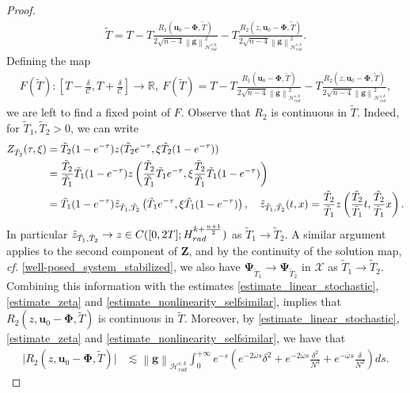 \documentclass[12pt,reqno]{amsart}
\theoremstyle{plain}
\theoremstyle{remark}
\theoremstyle{plain}
\theoremstyle{definition}
\numberwithin{equation}{section}
\numberwithin{equation}{section}
\def\R{{\mathbb R}}
\newcommand{\norm}[1]{\left\|#1\right\|}
\newcommand{\HH}{\mathcal{H}}
\begin{document}
\begin{proof}
\begin{align*}
			\tilde{T} =T-T\frac{R_{1}(\mathbf{u}_0-\mathbf{\Phi},\tilde{T})}{2\sqrt{n-4}\norm{\mathbf{g}}_{\HH_{rad}^{s,k}}^2}-T\frac{R_2(z,\mathbf{u}_0-\mathbf{\Phi},\tilde{T})}{2\sqrt{n-4}\norm{\mathbf{g}}_{\HH_{rad}^{s,k}}^2}.
		\end{align*}
		Defining the map
		\begin{align*}
			F(\tilde{T}):\left[T-\frac{\delta}{\mathcal{C}},T+\frac{\delta}{\mathcal{C}}\right]\rightarrow \R,\ F(\tilde{T})=T-T\frac{R_{1}(\mathbf{u}_0-\mathbf{\Phi},\tilde{T})}{2\sqrt{n-4}\norm{\mathbf{g}}_{\HH_{rad}^{s,k}}^2}-T\frac{R_2(z,\mathbf{u}_0-\mathbf{\Phi},\tilde{T})}{2\sqrt{n-4}\norm{\mathbf{g}}_{\HH_{rad}^{s,k}}^2},
		\end{align*}
		we are left to find a fixed point of $F.$
		Observe that $R_2$ is continuous in $\tilde{T}$. Indeed, for $\tilde{T}_1,\tilde{T}_2>0$, we can write \begin{align*}
			Z_{\tilde{T}_2}(\tau,\xi)&=\tilde{T}_2(1-e^{-\tau})z(\tilde{T}_2 e^{-\tau},\xi \tilde{T}_2(1-e^{-\tau}))\\ & =\frac{\tilde{T}_2}{\tilde{T}_1}\tilde{T}_1 (1-e^{-\tau}) z\left(\frac{\tilde{T}_2}{\tilde{T}_1}\tilde{T}_1 e^{-\tau},\xi \frac{\tilde{T}_2}{\tilde{T}_1}\tilde{T}_1 (1-e^{-\tau})\right)\\ & = \tilde{T}_1(1-e^{-\tau})\Tilde{z}_{\tilde{T}_1,\tilde{T}_2}\left(\tilde{T}_1 e^{-\tau},\xi \tilde{T}_1(1-e^{-\tau})\right),\quad \Tilde{z}_{\tilde{T}_1,\tilde{T}_2}(t,x)=\frac{\tilde{T}_2}{\tilde{T}_1} z\left(\frac{\tilde{T}_2}{\tilde{T}_1}t,\frac{\tilde{T}_2}{\tilde{T}_1}x\right).
		\end{align*}
		In particular $\Tilde{z}_{\tilde{T}_1,\tilde{T}_2}\rightarrow z \in C([0,2T];H^{k+\frac{n+1}{2}}_{rad})$ as $\tilde{T}_1\rightarrow \tilde{T}_2.$ A similar argument applies to the second component of $\mathbf{Z}$, and by the continuity of the solution map, \emph{cf.} \autoref{well-posed_system_stabilized}, we also have $\mathbf{\Psi}_{\tilde{T}_1}\rightarrow \mathbf{\Psi}_{\tilde{T}_2}$ in $\mathcal{X}$ as $\tilde{T}_1\rightarrow \tilde{T}_2.$ Combining this information with the estimates \eqref{estimate_linear_stochastic}, \eqref{estimate_zeta} and \eqref{estimate_nonlinearity_selfsimilar}, implies that $R_2(z,\mathbf{u}_0-\mathbf{\Phi},\tilde{T})$ is continuous in $\tilde{T}$. Moreover, by \eqref{estimate_linear_stochastic}, \eqref{estimate_zeta} and \eqref{estimate_nonlinearity_selfsimilar}, we have that
		\begin{align*}
			\lvert R_2(z,\mathbf{u}_0-\mathbf{\Phi},\tilde{T})\rvert & \lesssim \norm{\mathbf{g}}_{\HH_{rad}^{s,k}}\int_0^{+\infty} e^{-s}\left(e^{-2\overline{\omega} s}\delta^2+e^{-2\overline{\omega} s}\frac{\delta^2}{N^4}+e^{-\overline{\omega} s}\frac{\delta}{N^2}\right)ds.

\end{align*}
\end{proof}
\end{document}
